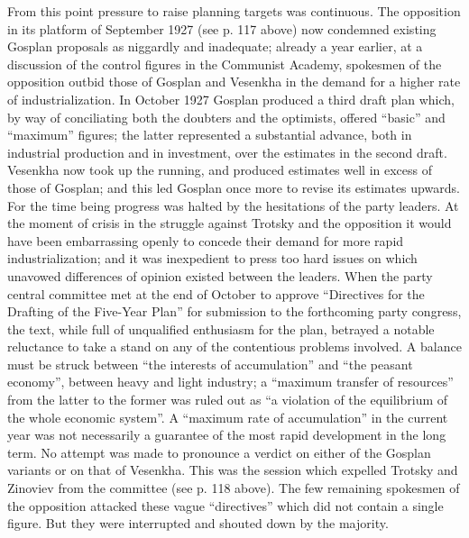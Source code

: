 From this point pressure to raise planning targets was continuous. The opposition in its platform of September 1927 (see p. 117 above) now condemned existing Gosplan proposals as niggardly and inadequate; already a year earlier, at a discussion of the control figures in the Communist Academy, spokesmen of the opposition outbid those of Gosplan and Vesenkha in the demand for a higher rate of industrialization. In October 1927 Gosplan produced a third draft plan which, by way of conciliating both the doubters and the optimists, offered ``basic'' and ``maximum'' figures; the latter represented a substantial advance, both in industrial production and in investment, over the estimates in the second draft. Vesenkha now took up the running, and produced estimates well in excess of those of Gosplan; and this led Gosplan once more to revise its estimates upwards. For the time being progress was halted by the hesitations of the party leaders. At the moment of crisis in the struggle against Trotsky and the opposition it would have been embarrassing openly to concede their demand for more rapid industrialization; and it was inexpedient to press too hard issues on which unavowed differences of opinion existed between the leaders. When the party central committee met at the end of October to approve ``Directives for the Drafting of the Five-Year Plan'' for submission to the forthcoming party congress, the text, while full of unqualified enthusiasm for the plan, betrayed a notable reluctance to take a stand on any of the contentious problems involved. A balance must be struck between ``the interests of accumulation'' and ``the peasant economy'', between heavy and light industry; a ``maximum transfer of resources'' from the latter to the former was ruled out as ``a violation of the equilibrium of the whole economic system''. A ``maximum rate of accumulation'' in the current year was not necessarily a guarantee of the most rapid development in the long term. No attempt was made to pronounce a verdict on either of the Gosplan variants or on that of Vesenkha. This was the session which expelled Trotsky and Zinoviev from the committee (see p. 118 above). The few remaining spokesmen of the opposition attacked these vague ``directives'' which did not contain a single figure. But they were interrupted and shouted down by the majority. 

